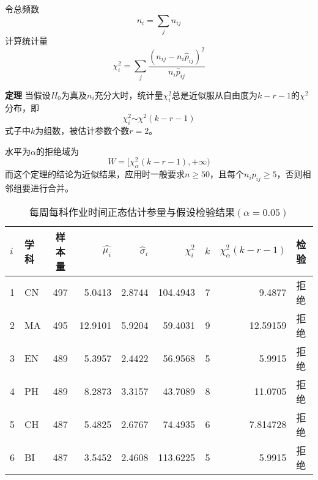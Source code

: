 \documentclass{article}
\begin{document}
\begin{CJK}{UTF8}{song}
令总频数
\begin{equation}
  n_i=\sum_{j}n_{ij}
\end{equation}
计算统计量~\cite[Appendix~D]{}
\begin{equation}
  \chi_i^2=\sum_{j}\frac{(n_{ij}-n_i\hat{p}_{ij})^2}{n_i\hat{p}_{ij}}
\end{equation}

\textbf{定理} 当假设$H_0$为真及$n_i$充分大时，统计量$\chi_i^2$总是近似服从自由度为$k-r-1$的$\chi^2$分布，即
\begin{equation}
\chi_i^2 \dot{\sim} \chi^2(k-r-1)
\end{equation}
式子中$k$为组数，被估计参数个数$r=2$。

水平为$\alpha$的拒绝域为
\begin{equation}
  W=[\chi_{\alpha}^2(k-r-1),+\infty )
\end{equation}
而这个定理的结论为近似结果，应用时一般要求$n\geqslant 50$，且每个$n_i p_{ij}\geqslant 5$，否则相邻组要进行合并。


\begin{table}[tbp]
\caption{每周每科作业时间正态估计参量与假设检验结果$(\alpha=0.05)$}
\begin{center}
\begin{threeparttable}

\begin{tabular}{llcrrrrrl}
  \toprule
  $i$ & 学科 & 样本量  & $\hat{\mu_i}$ & $\hat{\sigma}_i$ & $\chi_i^2$ & $k$ & $\chi_{\alpha}^2(k-r-1)$ & 检验\\
  \midrule
  1 & CN & 497 & 5.0413 & 2.8744 & 104.4943 & 7 & 9.4877 & 拒绝 \\
  2 & MA & 495 & 12.9101 & 5.9204 & 59.4031 & 9 & 12.59159 & 拒绝 \\
  3 & EN & 489 & 5.3957 & 2.4422 & 56.9568 & 5 & 5.9915 & 拒绝 \\
  4 & PH & 489 & 8.2873 & 3.3157 & 43.7089 & 8 & 11.0705 & 拒绝 \\
  5 & CH & 487 & 5.4825 & 2.6767 & 74.4935 & 6 & 7.814728 & 拒绝\\
  6 & BI & 487 & 3.5452 & 2.4608 & 113.6225 & 5 & 5.9915 & 拒绝\\
  \bottomrule
  \end{tabular}

\end{threeparttable}
\end{center}
\end{table}




\end{CJK}
\end{document}
